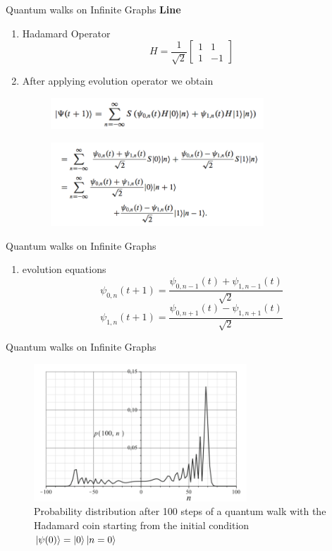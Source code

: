 \documentclass[xcolor=svgnames]{beamer}
\begin{document}
\begin{frame}{Quantum walks on Infinite Graphs}
\textbf{Line}
\begin{enumerate}
    \item Hadamard Operator $$H = \frac{1}{\sqrt{2}}\begin{bmatrix}
                                    1 & 1\\
                                    1 & -1
                                    \end{bmatrix}$$
    \item After applying evolution operator we obtain
    \begin{figure}
    \includegraphics[width = 8cm]{shift.png}
    \end{figure}
    \begin{figure}
        \includegraphics[width = 8cm]{shift2.png}
    \end{figure}
\end{enumerate}
\end{frame}

\begin{frame}{Quantum walks on Infinite Graphs}
\begin{enumerate}
    \item evolution equations
     $$\psi_{0,n}(t+1) = \dfrac{\psi_{0,n-1}(t) + \psi_{1,n-1}(t)}{\sqrt{2}}$$
    $$\psi_{1,n}(t+1) = \dfrac{\psi_{0,n+1}(t) - \psi_{1,n+1}(t)}{\sqrt{2}}$$
\end{enumerate}
\end{frame}

\begin{frame}{Quantum walks on Infinite Graphs}
\begin{figure}
    \centering
    \includegraphics[width = 8cm]{Line_Graph.png}
    \caption{Probability distribution after 100 steps of a quantum walk with the Hadamard coin starting from the initial condition $\ket{\psi(0)} = \ket{0}\ket{n=0}$}
\end{figure}
    
\end{frame}
\end{document}
